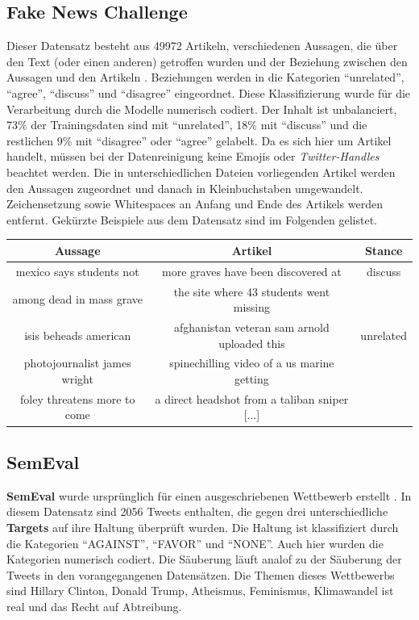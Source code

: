 \subsection{Fake News Challenge}
\label{sec:tfnc}
Dieser Datensatz besteht aus 49972 Artikeln, verschiedenen Aussagen, die \"uber den Text (oder einen anderen) getroffen wurden und der Beziehung zwischen den Aussagen und den Artikeln \cite{fnc}. Beziehungen werden in die Kategorien "`unrelated"', "`agree"', "`discuss"' und "`disagree"' eingeordnet. Diese Klassifizierung wurde f\"ur die Verarbeitung durch die Modelle numerisch codiert. Der Inhalt ist unbalanciert, 73\% der Trainingsdaten sind mit "`unrelated"', 18\% mit "`discuss"' und die restlichen 9\% mit "`disagree"' oder "`agree"' gelabelt. Da es sich hier um Artikel handelt, m\"ussen bei der Datenreinigung keine Emojis oder \textit{Twitter-Handles} beachtet werden. Die in unterschiedlichen Dateien vorliegenden Artikel werden den Aussagen zugeordnet und danach in Kleinbuchstaben umgewandelt. Zeichensetzung sowie Whitespaces an Anfang und Ende des Artikels werden entfernt. Gek\"urzte Beispiele aus dem Datensatz sind im Folgenden gelistet.
\begin{center}
\begin{tabular}{|c|c|c|}
\hline
Aussage & Artikel & Stance\\ 
\hline\hline
 mexico says students not& more graves have been discovered at  & discuss\\
 among dead in mass grave & the site where 43 students went missing &\\
\hline
isis beheads american & afghanistan veteran sam arnold uploaded this & unrelated\\
 photojournalist james wright & spinechilling  video of a us marine getting &\\
 foley threatens more to come & a direct headshot from a taliban sniper [...] &\\
\hline    
\end{tabular}
\end{center}

\subsection{SemEval}
\label{sec:semeval}
\textbf{SemEval} wurde urspr\"unglich f\"ur einen ausgeschriebenen Wettbewerb erstellt \cite{semeval}. In diesem Datensatz sind 2056 Tweets enthalten, die gegen drei unterschiedliche \textbf{Targets} auf ihre Haltung \"uberpr\"uft wurden. Die Haltung ist klassifiziert durch die Kategorien "`AGAINST"', "`FAVOR"' und "`NONE"'. Auch hier wurden die Kategorien numerisch codiert. Die S\"auberung l\"auft analof zu der S\"auberung der Tweets in den vorangegangenen Datens\"atzen. Die Themen dieses Wettbewerbs sind Hillary Clinton, Donald Trump, Atheismus, Feminismus, Klimawandel ist real und das Recht auf Abtreibung.

